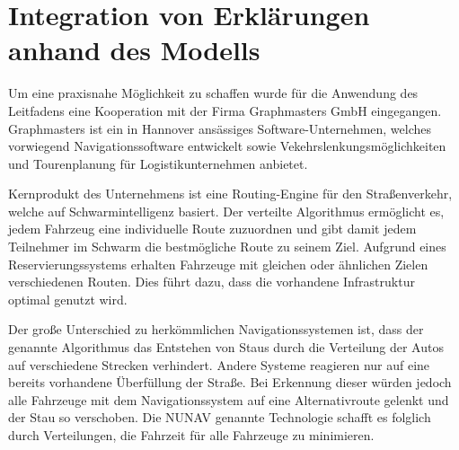 \section{Integration von Erklärungen anhand des Modells}

Um eine praxisnahe Möglichkeit zu schaffen wurde für die Anwendung des Leitfadens eine Kooperation mit der Firma Graphmasters GmbH eingegangen. Graphmasters ist ein in Hannover ansässiges Software-Unternehmen, welches vorwiegend Navigationssoftware entwickelt sowie Vekehrslenkungsmöglichkeiten und Tourenplanung für Logistikunternehmen anbietet. 

Kernprodukt des Unternehmens ist eine Routing-Engine für den Straßenverkehr, welche auf Schwarmintelligenz basiert. Der verteilte Algorithmus ermöglicht es, jedem Fahrzeug eine individuelle Route zuzuordnen und gibt damit jedem Teilnehmer im Schwarm die bestmögliche Route zu seinem Ziel. Aufgrund eines Reservierungssystems erhalten Fahrzeuge mit gleichen oder ähnlichen Zielen verschiedenen Routen. Dies führt dazu, dass die vorhandene Infrastruktur optimal genutzt wird.

Der große Unterschied zu herkömmlichen Navigationssystemen ist, dass der genannte Algorithmus das Entstehen von Staus durch die Verteilung der Autos auf verschiedene Strecken verhindert. Andere Systeme reagieren nur auf eine bereits vorhandene Überfüllung der Straße. Bei Erkennung dieser würden jedoch alle Fahrzeuge mit dem Navigationssystem auf eine Alternativroute gelenkt und der Stau so verschoben. Die \glqq NUNAV\grqq{} genannte Technologie schaﬀt es folglich durch Verteilungen, die Fahrzeit für alle Fahrzeuge zu minimieren.









